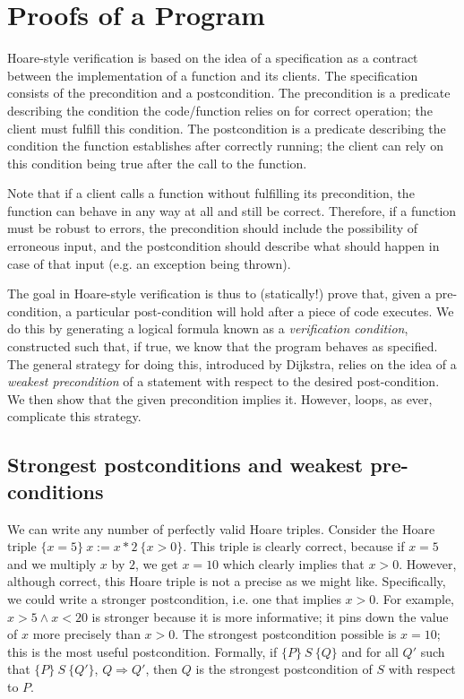 \documentclass[11pt]{article}
\begin{document}
\section{Proofs of a Program}

Hoare-style verification is based on the idea of a
specification as a contract between the implementation of a function and its
clients.  The specification consists of the precondition and a postcondition.
The precondition is a predicate describing the condition the code/function relies on
for correct operation; the client must fulfill this condition.  The
postcondition is a predicate describing the condition the function establishes
after correctly running; the client can rely on this condition being true after
the call to the function.

Note that if a client calls a function without fulfilling its precondition, the
function can behave in any way at all and still be correct.  Therefore, if
a function must be robust to errors, the precondition should include
the possibility of erroneous input, and the postcondition should describe what
should happen in case of that input (e.g. an exception being thrown).

The goal in Hoare-style verification is thus to (statically!) prove that, given
a pre-condition, a particular post-condition will hold after a piece of code
executes.  We do this by generating a logical formula known as a
\emph{verification condition}, constructed such that, if true, we know that the program
behaves as specified.  The general strategy for doing this, introduced by
Dijkstra, relies on the idea of a \emph{weakest precondition} of a statement
with respect to the desired post-condition.  We then show that the
given precondition implies it.  However, loops, as ever, complicate this
strategy.

\subsection{Strongest postconditions and weakest pre-conditions}

We can write any number of perfectly valid Hoare triples.  Consider the Hoare
triple $\{x = 5\} ~x := x * 2~ \{ x > 0 \}$.  This triple is clearly correct,
because if $x=5$ and we multiply $x$ by $2$, we get $x=10$ which clearly implies
that $x>0$.  However, although correct, this Hoare triple is not a precise as we
might like.  Specifically, we could write a stronger postcondition, i.e. one
that implies $x>0$.  For example, $x>5 \land x < 20$ is stronger because it is
more informative; it pins down the value of $x$ more precisely than $x>0$.  The
strongest postcondition possible is $x=10$; this is the most useful
postcondition.  Formally, if $\{P\} ~S~ \{Q\}$ and for all $Q'$ such that
$\{P\} ~S~ \{Q'\}$, $Q \Rightarrow Q'$, then $Q$ is the strongest
postcondition of $S$ with respect to $P$.
\end{document}
